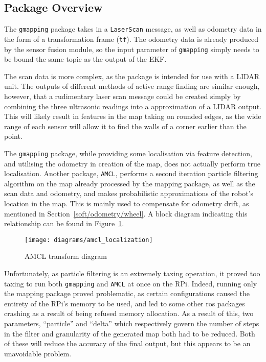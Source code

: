 \subsection{Package Overview}\label{soft/SLAM/package}

The \verb|gmapping| package takes in a \verb|LaserScan| message, as well as odometry data in the form of a
transformation frame (\verb|tf|). The odometry data is already produced by the sensor fusion module, so the
input parameter of \verb|gmapping| simply needs to be bound the same topic as the output of the EKF.

The scan data is more complex, as the package is intended for use with a LIDAR unit. The outputs of different
methods of active range finding are similar enough, however, that a rudimentary laser scan message could be
created simply by combining the three ultrasonic readings into a approximation of a
LIDAR output. This will likely result in features in the map taking on rounded edges, as the wide range of
each sensor will allow it to find the walls of a corner earlier than the point.

The \verb|gmapping| package, while providing some localisation via feature detection, and utilising the odometry
in creation of the map, does not actually perform true localisation. Another package, \verb|AMCL|, performs a
second iteration particle filtering algorithm on the map already processed by the mapping package, as well as
the scan data and odometry, and makes probabilistic approximations of the robot's location in the map. This is
mainly used to compensate for odometry drift, as mentioned in Section~\ref{soft/odometry/wheel}. A block diagram
indicating this relationship can be found in Figure~\ref{fig:amcl}.

\begin{figure}[H]
	\centering
	\texttt{[image: diagrams/amcl\_localization]}
	\caption{AMCL transform diagram~\cite{macenski_amcl}}\label{fig:amcl}
\end{figure}

Unfortunately, as particle filtering is an extremely taxing operation, it proved too taxing to run both
\verb|gmapping| and \verb|AMCL| at once on the RPi. Indeed, running only the mapping package proved problematic,
as certain configurations caused the entirety of the RPi's memory to be used, and led to some other ros packages
crashing as a result of being refused memory allocation. As a result of this, two parameters, ``particle'' and
``delta'' which respectively govern the number of steps in the filter and granularity of the generated map both
had to be reduced. Both of these will reduce the accuracy of the final output, but this appears to be an unavoidable problem.

